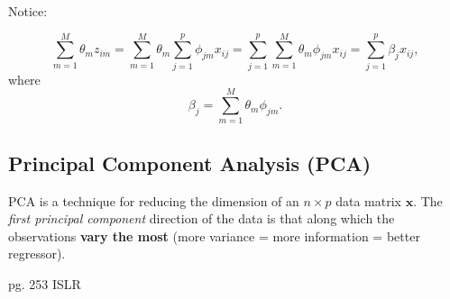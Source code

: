 \documentclass[11pt]{article}
\begin{document}
\begin{note}
    Notice:

    \begin{equation*}
        \sum_{m=1}^M \theta_m z_{im} = \sum_{m=1}^M \theta_m \sum_{j=1}^p \phi_{jm}x_{ij} = \sum_{j=1}^p \sum_{m=1}^M \theta_m \phi_{jm} x_{ij} = \sum_{j=1}^p \beta_j x_{ij},
    \end{equation*}
    where
    \begin{equation*}
        \beta_j = \sum_{m=1}^M \theta_m \phi_{jm}.
    \end{equation*}
\end{note}

\subsection{Principal Component Analysis (PCA)}

PCA is a technique for reducing the dimension of an $n \times p$ data matrix $\mathbf{x}$. The \textit{first principal component} direction of the data is that along which the observations \textbf{vary the most} (more variance = more information = better regressor).

pg. 253 ISLR
\end{document}
